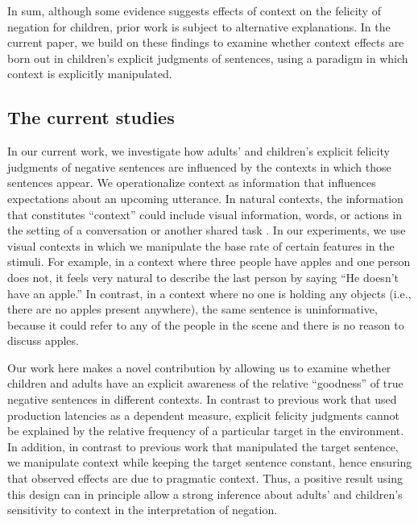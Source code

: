 \documentclass[man, noapacite]{apa2}
\begin{document}
In sum, although some evidence suggests effects of context on the felicity of negation for children, prior work is subject to alternative explanations. In the current paper, we build on these findings to examine whether context effects are born out in children's explicit judgments of sentences, using a paradigm in which context is explicitly manipulated.

\subsection{The current studies}

%

In our current work, we investigate how adults' and children's explicit felicity judgments of negative sentences are influenced by the contexts in which those sentences appear. We operationalize context as information that influences expectations about an upcoming utterance. In natural contexts, the information that constitutes ``context'' could include visual information, words, or actions in the setting of a conversation or another shared task \cite{clark1996}. In our experiments, we use visual contexts in which we manipulate the base rate of certain features in the stimuli. For example, in a context where three people have apples and one person does not, it feels very natural to describe the last person by saying ``He doesn't have an apple.'' In contrast, in a context where no one is holding any objects (i.e., there are no apples present anywhere), the same sentence is uninformative, because it could refer to any of the people in the scene and there is no reason to discuss apples.

Our work here makes a novel contribution by allowing us to examine whether children and adults have an explicit awareness of the relative ``goodness'' of true negative sentences in different contexts. In contrast to previous work that used production latencies as a dependent measure, explicit felicity judgments cannot be explained by the relative frequency of a particular target in the environment. In addition, in contrast to previous work that manipulated the target sentence, we manipulate context while keeping the target sentence constant, hence ensuring that observed effects are due to pragmatic context. Thus, a positive result using this design can in principle allow a strong inference about adults' and children's sensitivity to context in the interpretation of negation.
\end{document}
